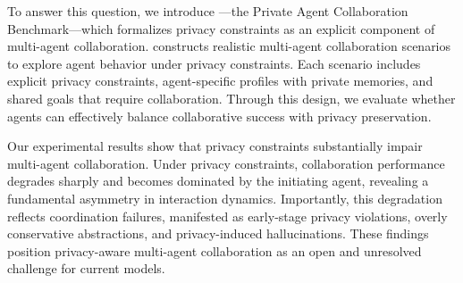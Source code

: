 To answer this question, we introduce \ours—the Private Agent Collaboration Benchmark—which formalizes privacy constraints as an explicit component of multi-agent collaboration.
\ours constructs realistic multi-agent collaboration scenarios to explore agent behavior under privacy constraints.
Each scenario includes explicit privacy constraints, agent-specific profiles with private memories, and shared goals that require collaboration.
Through this design, we evaluate whether agents can effectively balance collaborative success with privacy preservation.



Our experimental results show that privacy constraints substantially impair multi-agent collaboration. 
Under privacy constraints, collaboration performance degrades sharply and becomes dominated by the initiating agent, revealing a fundamental asymmetry in interaction dynamics. 
Importantly, this degradation reflects coordination failures, manifested as early-stage privacy violations, overly conservative abstractions, and privacy-induced hallucinations.
These findings position privacy-aware multi-agent collaboration as an open and unresolved challenge for current models.


